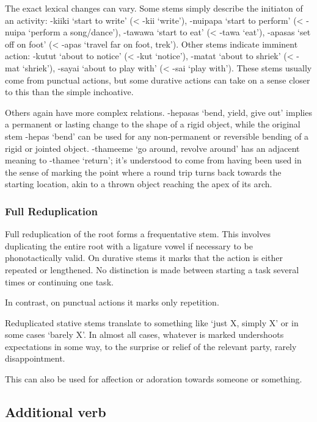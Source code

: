 \documentclass[smallroyalvopaper,9pt]{memoir}
\begin{document}
The exact lexical changes can vary. Some stems simply describe the initiaton of an activity: -kiiki `start to write' (< -kii `write'), -nuipapa `start to perform' (< -nuipa `perform a song/dance'), -tawawa `start to eat' (< -tawa `eat'), -apasas `set off on foot' (< -apas `travel far on foot, trek'). Other stems indicate imminent action: -kutut `about to notice' (< -kut `notice'), -matat `about to shriek' (< -mat `shriek'), -sayai `about to play with' (< -sai `play with'). These stems usually come from punctual actions, but some durative actions can take on a sense closer to this than the simple inchoative.

Others again have more complex relations. -hepasas `bend, yield, give out' implies a permanent or lasting change to the shape of a rigid object, while the original stem -hepas `bend' can be used for any non-permanent or reversible bending of a rigid or jointed object. -thameeme `go around, revolve around' has an adjacent meaning to -thamee `return'; it's understood to come from having been used in the sense of marking the point where a round trip turns back towards the starting location, akin to a thrown object reaching the apex of its arch.

\subsubsection{Full Reduplication}

Full reduplication of the root forms a frequentative stem. This involves duplicating the entire root with a ligature vowel if necessary to be phonotactically valid. On durative stems it marks that the action is either repeated or lengthened. No distinction is made between starting a task several times or continuing one task.


In contrast, on punctual actions it marks only repetition. 


Reduplicated stative stems translate to something like `just X, simply X' or in some cases `barely X'. In almost all cases, whatever is marked undershoots expectations in some way, to the surprise or relief of the relevant party, rarely disappointment.


This can also be used for affection or adoration towards someone or something.


\subsection{Additional verb}
\end{document}
